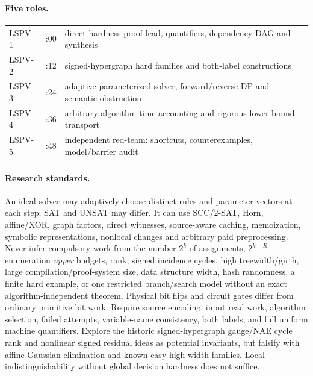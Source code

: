 \documentclass[11pt]{article}
\begin{document}
\paragraph{Five roles.}
\begin{center}\begin{tabular}{lll}
LSPV-1 & :00 & direct-hardness proof lead, quantifiers, dependency DAG and synthesis\\
LSPV-2 & :12 & signed-hypergraph hard families and both-label constructions\\
LSPV-3 & :24 & adaptive parameterized solver, forward/reverse DP and semantic obstruction\\
LSPV-4 & :36 & arbitrary-algorithm time accounting and rigorous lower-bound transport\\
LSPV-5 & :48 & independent red-team: shortcuts, counterexamples, model/barrier audit
\end{tabular}\end{center}

\paragraph{Research standards.}
An ideal solver may adaptively choose distinct rules and parameter vectors at each step; SAT and UNSAT may differ. It can use SCC/2-SAT, Horn, affine/XOR, graph factors, direct witnesses, source-aware caching, memoization, symbolic representations, nonlocal changes and arbitrary paid preprocessing. Never infer compulsory work from the number $2^k$ of assignments, $2^{k-R}$ enumeration \emph{upper} budgets, rank, signed incidence cycles, high treewidth/girth, large compilation/proof-system size, data structure width, hash randomness, a finite hard example, or one restricted branch/search model without an exact algorithm-independent theorem. Physical bit flips and circuit gates differ from ordinary primitive bit work. Require source encoding, input read work, algorithm selection, failed attempts, variable-name consistency, both labels, and full uniform machine quantifiers. Explore the historic signed-hypergraph gauge/NAE cycle rank and nonlinear signed residual ideas as potential invariants, but falsify with affine Gaussian-elimination and known easy high-width families. Local indistinguishability without global decision hardness does not suffice.
\end{document}
